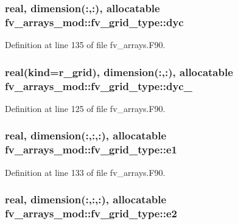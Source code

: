\subsubsection[{dyc}]{\setlength{\rightskip}{0pt plus 5cm}real, dimension(\-:,\-:), allocatable fv\-\_\-arrays\-\_\-mod\-::fv\-\_\-grid\-\_\-type\-::dyc}\label{structfv__arrays__mod_1_1fv__grid__type_ab94e6fe03dec09dba3538b40f011ba71}


Definition at line 135 of file fv\-\_\-arrays.\-F90.

\subsubsection[{dyc\-\_\-64}]{\setlength{\rightskip}{0pt plus 5cm}real(kind={\bf r\-\_\-grid}), dimension(\-:,\-:), allocatable fv\-\_\-arrays\-\_\-mod\-::fv\-\_\-grid\-\_\-type\-::dyc\-\_}\label{structfv__arrays__mod_1_1fv__grid__type_a64e92f11a79556bfd02e38a249b0a918}


Definition at line 125 of file fv\-\_\-arrays.\-F90.

\subsubsection[{e1}]{\setlength{\rightskip}{0pt plus 5cm}real, dimension(\-:,\-:,\-:), allocatable fv\-\_\-arrays\-\_\-mod\-::fv\-\_\-grid\-\_\-type\-::e1}\label{structfv__arrays__mod_1_1fv__grid__type_a60093b96a91fd6682fe9d3a13f7e33f6}


Definition at line 133 of file fv\-\_\-arrays.\-F90.

\subsubsection[{e2}]{\setlength{\rightskip}{0pt plus 5cm}real, dimension(\-:,\-:,\-:), allocatable fv\-\_\-arrays\-\_\-mod\-::fv\-\_\-grid\-\_\-type\-::e2}\label{structfv__arrays__mod_1_1fv__grid__type_a5304234fe48437b157b8d6a0796fb4e7}


